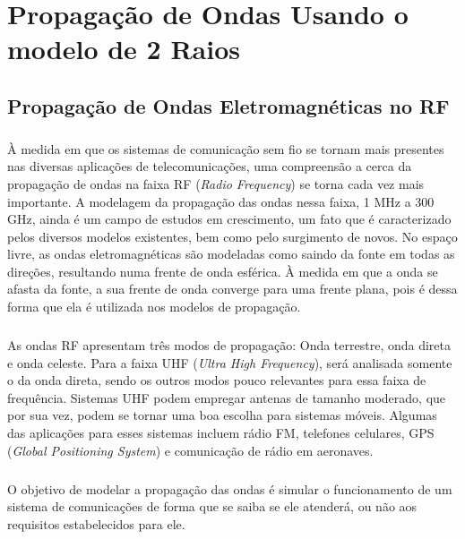 \chapter{Propagação de Ondas Usando o modelo de 2 Raios}
\noindent

\section{Propagação de Ondas Eletromagnéticas no RF}
\paragraph{}À medida em que os sistemas de comunicação sem fio se tornam mais presentes nas diversas aplicações de telecomunicações, uma compreensão a cerca da propagação de ondas na faixa RF (\textit{Radio Frequency}) se torna cada vez mais importante. A modelagem da propagação das ondas nessa faixa, 1 MHz a 300 GHz, ainda é um campo de estudos em crescimento, um fato que é caracterizado pelos diversos modelos existentes, bem como pelo surgimento de novos. No espaço livre, as ondas eletromagnéticas são modeladas como saindo da fonte em todas as direções, resultando numa frente de onda esférica. À medida em que a onda se afasta da fonte, a sua frente de onda converge para uma frente plana, pois é dessa forma que ela é utilizada nos modelos de propagação.

\paragraph{}As ondas RF apresentam três modos de propagação: Onda terrestre, onda direta e onda celeste. Para a faixa UHF (\textit{Ultra High Frequency}), será analisada somente o da onda direta, sendo os outros modos pouco relevantes para essa faixa de frequência. Sistemas UHF podem empregar antenas de tamanho moderado, que por sua vez, podem se tornar uma boa escolha para sistemas móveis. Algumas das aplicações para esses sistemas incluem rádio FM, telefones celulares, GPS (\textit{Global Positioning System}) e comunicação de rádio em aeronaves.




\paragraph{}O objetivo de modelar a propagação das ondas é simular o funcionamento de um sistema de comunicações de forma que se saiba se ele atenderá, ou não aos requisitos estabelecidos para ele. 


